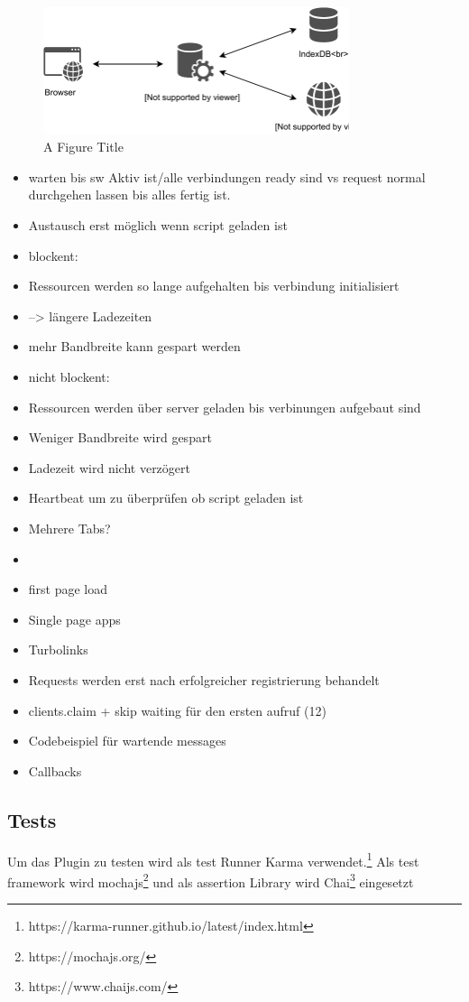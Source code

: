 \begin{figure}[!h]
	\centering
	\includegraphics[width=0.8\textwidth]{figures/ServiceWorker}
	\caption[A Figure Short-Title]{A Figure Title}
	\label{fig:sequenceDiagram}
\end{figure}
\begin{itemize}
  \item warten bis sw Aktiv ist/alle verbindungen ready sind vs request normal durchgehen lassen bis alles fertig ist.
  \item 	Austausch erst möglich wenn script geladen ist
  \item 	blockent: 
  \item 		Ressourcen werden so lange aufgehalten bis verbindung initialisiert
  \item 		--> längere Ladezeiten
  \item 		mehr Bandbreite kann gespart werden
  \item 	nicht blockent: 
  \item 		Ressourcen werden über server geladen bis verbinungen aufgebaut sind
  \item 		Weniger Bandbreite wird gespart
  \item 		Ladezeit wird nicht verzögert
  \item 		Heartbeat um zu überprüfen ob script geladen ist
  \item Mehrere Tabs?
  \item 		
  \item first page load
  \item Single page apps
  \item Turbolinks
  \item Requests werden erst nach erfolgreicher registrierung behandelt
  \item clients.claim + skip waiting für den ersten aufruf (12)
  \item Codebeispiel für wartende messages
  \item 	Callbacks
\end{itemize}

\subsection{Tests}
Um das Plugin zu testen wird als test Runner Karma verwendet.\footnote{https://karma-runner.github.io/latest/index.html} Als test framework wird mochajs\footnote{https://mochajs.org/} und als assertion Library wird Chai\footnote{https://www.chaijs.com/} eingesetzt 

